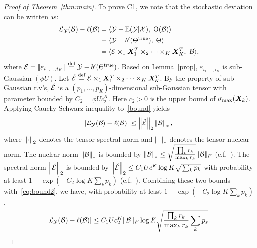 \documentclass[11pt]{article}
\theoremstyle{plain}
\theoremstyle{definition}
\begin{document}
\begin{proof}[Proof of Theorem~\ref{thm:main}]
To prove C1, we note that the stochastic deviation can be written as:
\begin{align}\label{bound}
\tL_{\tY}(\tB)-\ell(\tB)&=\langle \tY-\mathbb{E}(\tY|\tX),\ \Theta(\tB)\rangle\notag \\
&= \langle \tY- b'(\trueT),\ \Theta\rangle \notag \\
&= \langle \tE\times_1\mX^T_1\times_2\cdots\times_K\mX^T_K,\ \tB\rangle,
\end{align}
where $\mathcal{E}=\llbracket \varepsilon_{i_1,\ldots,i_K} \rrbracket\stackrel{\text{def}}{=}\mathcal{Y}-b'(\Theta^{\text{true}})$. Based on Lemma~\ref{prop}, $\varepsilon_{i_1,\ldots,i_K}$ is sub-Gaussian-$(\phi U)$. Let $\check{\mathcal{E}}\stackrel{\text{def}}{=}\mathcal{E}\times_1\bm X^T_1\times_2\cdots\times_K\bm X^T_K$. By the property of sub-Gaussian r.v's, $\check {\mathcal{E}}$ is a $(p_1,\ldots,p_K)$-dimensional sub-Gaussian tensor with parameter bounded by $C_2=\phi Uc^{K}_2$. Here $c_2>0$ is the upper bound of $\sigma_{\max}(\bm X_k)$. Applying Cauchy-Schwarz inequality to~\eqref{bound} yields
\begin{equation}\label{eq:bound2}
|\mathcal{L}_{\mathcal{Y}}(\mathcal{B})-\ell(\mathcal{B})|\leq \left\lVert\check {\mathcal{E}}\right\rVert_2 \left\lVert\mathcal{B}\right\rVert_*,
\end{equation}
where $\left\lVert\cdot\right\rVert_2$ denotes the tensor spectral norm and $\left\lVert\cdot\right\rVert_*$ denotes the tensor nuclear norm. The nuclear norm $\left\lVert\mathcal{B}\right\rVert_*$ is  bounded by $\left\lVert\mathcal{B}\right\rVert_*\leq \sqrt{{\prod_k r_k \over \max_k r_k}}\lVert\mathcal{B}\rVert_F$ (c.f.~\cite{wang2018learning,wang2017operator}). The spectral norm $\left\lVert\check {\mathcal{E}}\right\rVert_2$ is bounded by $\left\lVert\check {\mathcal{E}}\right\rVert_2\leq C_1 Uc^{K} \log K \sqrt{\sum_k p_k}$ with probability at least $1-\exp(-C_2\log K \sum_kp_k)$ (c.f.~\cite{wang2018learning,tomioka2014spectral}). Combining these two bounds with~\eqref{eq:bound2}, we have, with probability at least $1-\exp(-C_2\log K \sum_kp_k)$, 
\[
|\mathcal{L}_{\mathcal{Y}}(\mathcal{B})-\ell(\mathcal{B})|\leq C_1Uc_2^{K}\lVert\mathcal{B}\rVert_F \log K  \sqrt{ {\prod_k r_k\over \max_k r_k}\sum_k p_k}.
\]


\end{proof}
\end{document}
